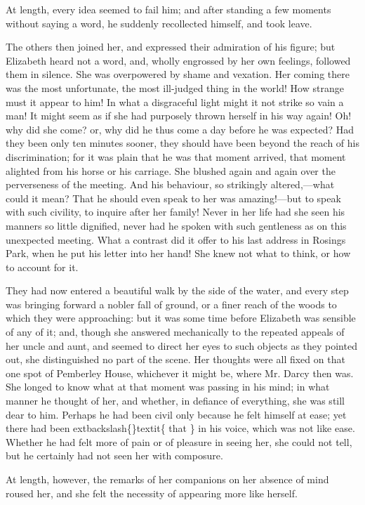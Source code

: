 \documentclass[10pt]{book}
\begin{document}
   At length, every idea seemed to fail him; and after standing a few
moments without saying a word, he suddenly recollected himself, and took
leave.
  

   The others then joined her, and expressed their admiration of his
figure; but Elizabeth heard not a word, and, wholly engrossed by her own
feelings, followed them in silence. She was overpowered by shame and
vexation. Her coming there was the most unfortunate, the most ill-judged
thing in the world! How strange must it
   appear to him! In what a
disgraceful light might it not strike so vain a man! It might seem as if
she had purposely thrown herself in his way again! Oh! why did she come?
or, why did he thus come a day before he was expected? Had they been
only ten minutes sooner, they should have been beyond the reach of his
discrimination; for it was plain that he was that moment arrived, that
moment alighted from his horse or his carriage. She blushed again and
again over the perverseness of the meeting. And his behaviour, so
strikingly altered,—what could it mean? That he should even speak to
her was amazing!—but to speak with such civility, to inquire after her
family! Never in her life had she seen his manners so little dignified,
never had he spoken with such gentleness as on this unexpected meeting.
What a contrast did it offer to his last address in Rosings Park, when
he put his letter into her hand! She knew not what to think, or how to
account for it.
  

   They had now entered a beautiful walk by the side of the water, and
every step was bringing forward a nobler fall of ground, or a finer
reach of the woods to which they were approaching: but it was some time
before Elizabeth was sensible of any of it; and, though she answered
mechanically to the repeated appeals of her uncle and aunt, and seemed
to direct her eyes to such objects as they pointed out, she
distinguished no part of the scene. Her thoughts were all fixed on that
one spot of Pemberley House, whichever it might be, where Mr. Darcy then
was. She longed to know what at that moment was passing in his mind; in
what manner he thought of her, and whether, in defiance of everything,
she was still dear to him. Perhaps he had been civil only because he
felt himself at ease; yet there had been
   	extbackslash\{\}textit\{
    that
   \}
   in his voice, which was
not like ease. Whether he had felt more of pain or of pleasure in seeing
her, she could not tell, but he certainly had not seen her with
composure.
  

   At length, however, the remarks of her companions on her absence of mind
roused her, and she felt the necessity of appearing more like herself.
  
\end{document}
